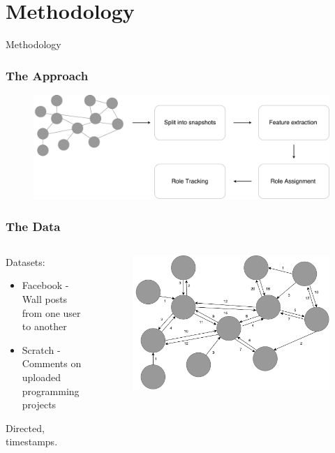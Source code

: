\section{Methodology}

\begin{frame}
\begin{center}
     	\huge Methodology
     \end{center}
\end{frame}

\begin{frame}
\frametitle{The Approach}
\begin{figure}
\includegraphics[scale=0.14]{graphics/setup.pdf}
\end{figure}
\end{frame}

\begin{frame}
\frametitle{The Data}
\begin{columns}
	\begin{column}{0.45\textwidth}
		Datasets:
			\begin{itemize}
				\item Facebook - Wall posts from one user to another
				\item Scratch - Comments on uploaded programming projects 
			\end{itemize}
			
		Directed, timestamps.
		\end{column}
		\begin{column}{0.55\textwidth}
			\begin{figure}
				\includegraphics[scale=0.24]{graphics/directed_network.pdf}
			\end{figure}
		\end{column}
	\end{columns}
\end{frame}

